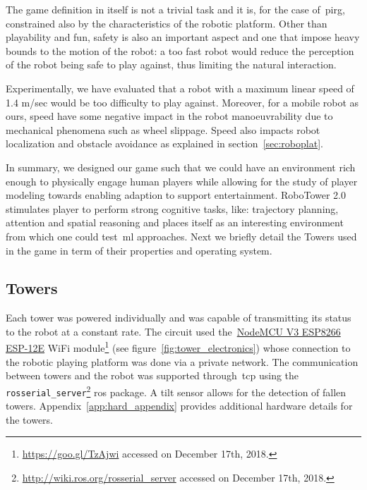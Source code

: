 The game definition in itself is not a trivial task and it is, for the case of~\gls{pirg}, constrained also by the characteristics of the robotic platform. Other than playability and fun, safety is also an important aspect and one that impose heavy bounds to the motion of the robot: a too fast  robot would reduce the perception of the robot being safe to play against, thus limiting the natural interaction.

Experimentally, we have evaluated that a robot with a maximum linear speed of 1.4 m/sec would be too difficulty to play against. Moreover, for a mobile robot as ours, speed have some negative impact in the robot manoeuvrability due to mechanical phenomena such as wheel slippage. Speed also impacts robot localization and obstacle avoidance as explained in section~\ref{sec:roboplat}.

In summary, we designed our game such that we could have an environment rich enough to physically engage human players while allowing for the study of player modeling towards enabling adaption to support entertainment. RoboTower 2.0 stimulates player to perform strong cognitive tasks, like: trajectory planning, attention and spatial reasoning and places itself as an interesting environment from which one could test~\gls{ml} approaches. Next we briefly detail the Towers used in the game in term of their properties and operating system.



\subsection{Towers}\label{sec:towers}
Each tower was powered individually and was capable of transmitting its status to the robot at a constant rate. The circuit used the~\href{https://einstronic.com/wp-content/uploads/2017/06/NodeMCU-ESP8266-ESP-12E-Catalogue.pdf}{NodeMCU V3 ESP8266 ESP-12E} WiFi module\footnote{\url{https://goo.gl/TzAjwi} accessed on December 17th, 2018.} (see figure~\ref{fig:tower_electronics}) whose connection to the robotic playing platform was done via a private network. The communication between towers and the robot was supported through~\gls{tcp} using the \verb|rosserial_server|\footnote{\url{http://wiki.ros.org/rosserial_server} accessed on December 17th, 2018.} \gls{ros} package. A tilt sensor allows for the detection of fallen towers. Appendix~\ref{app:hard_appendix} provides additional hardware details for the towers. 

